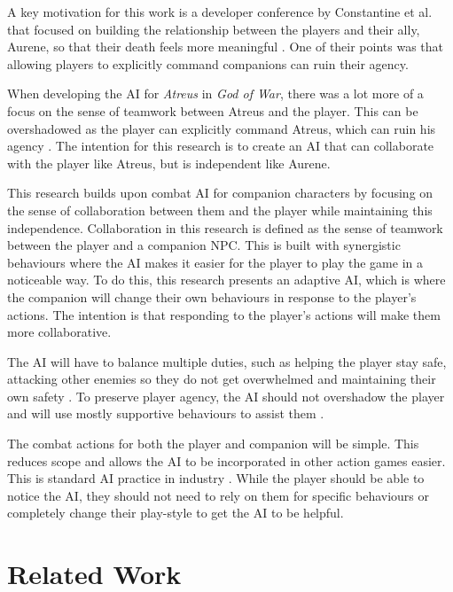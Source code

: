 \documentclass{IEEEtran}
\begin{document}
A key motivation for this work is a developer conference by Constantine et al. that focused on building the relationship between the players and their ally, Aurene, so that their death feels more meaningful \cite{EGXCharacterDeathGuildWars}. One of their points was that allowing players to explicitly command companions can ruin their agency.

When developing the AI for \textit{Atreus} in \textit{God of War}, there was a lot more of a focus on the sense of teamwork between Atreus and the player. This can be overshadowed as the player can explicitly command Atreus, which can ruin his agency \cite{EGXCharacterDeathGuildWars}. The intention for this research is to create an AI that can collaborate with the player like Atreus, but is independent like Aurene.

This research builds upon combat AI for companion characters by focusing on the sense of collaboration between them and the player while maintaining this independence. Collaboration in this research is defined as the sense of teamwork between the player and a companion NPC. This is built with synergistic behaviours where the AI makes it easier for the player to play the game in a noticeable way. To do this, this research presents an adaptive AI, which is where the companion will change their own behaviours in response to the player's actions. The intention is that responding to the player's actions will make them more collaborative.

The AI will have to balance multiple duties, such as helping the player stay safe, attacking other enemies so they do not get overwhelmed and maintaining their own safety \cite{CoupledEmpowermentMaximisation, tremblay2013adaptive}. To preserve player agency, the AI should not overshadow the player and will use mostly supportive behaviours to assist them \cite{DesignDocAIAllies}.

The combat actions for both the player and companion will be simple. This reduces scope and allows the AI to be incorporated in other action games easier. This is standard AI practice in industry \cite{GMTGoodAI, GDCLessIsMore, GDCSimplestAITrick}. While the player should be able to notice the AI, they should not need to rely on them for specific behaviours or completely change their play-style to get the AI to be helpful.

\section{Related Work}
\label{RelatedWork}
\end{document}
